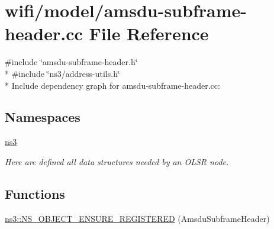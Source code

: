 \hypertarget{amsdu-subframe-header_8cc}{}\section{wifi/model/amsdu-\/subframe-\/header.cc File Reference}
\label{amsdu-subframe-header_8cc}
{\ttfamily \#include \char`\"{}amsdu-\/subframe-\/header.\+h\char`\"{}}\\*
{\ttfamily \#include \char`\"{}ns3/address-\/utils.\+h\char`\"{}}\\*
Include dependency graph for amsdu-\/subframe-\/header.cc\+:
\subsection*{Namespaces}
\begin{DoxyCompactItemize}
\item 
 \hyperlink{namespacens3}{ns3}
\begin{DoxyCompactList}\small\item\em Here are defined all data structures needed by an O\+L\+SR node. \end{DoxyCompactList}\end{DoxyCompactItemize}
\subsection*{Functions}
\begin{DoxyCompactItemize}
\item 
\hyperlink{namespacens3_a8e553e481021da5d3be80db344573111}{ns3\+::\+N\+S\+\_\+\+O\+B\+J\+E\+C\+T\+\_\+\+E\+N\+S\+U\+R\+E\+\_\+\+R\+E\+G\+I\+S\+T\+E\+R\+ED} (Amsdu\+Subframe\+Header)
\end{DoxyCompactItemize}
